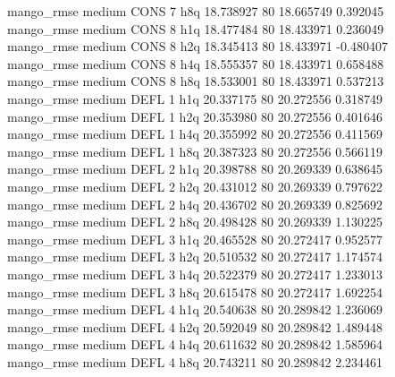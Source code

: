       mango_rmse     medium     CONS                 7                  h8q 18.738927 80      18.665749           0.392045
       mango_rmse     medium     CONS                 8                  h1q 18.477484 80      18.433971           0.236049
       mango_rmse     medium     CONS                 8                  h2q 18.345413 80      18.433971          -0.480407
       mango_rmse     medium     CONS                 8                  h4q 18.555357 80      18.433971           0.658488
       mango_rmse     medium     CONS                 8                  h8q 18.533001 80      18.433971           0.537213
       mango_rmse     medium     DEFL                 1                  h1q 20.337175 80      20.272556           0.318749
       mango_rmse     medium     DEFL                 1                  h2q 20.353980 80      20.272556           0.401646
       mango_rmse     medium     DEFL                 1                  h4q 20.355992 80      20.272556           0.411569
       mango_rmse     medium     DEFL                 1                  h8q 20.387323 80      20.272556           0.566119
       mango_rmse     medium     DEFL                 2                  h1q 20.398788 80      20.269339           0.638645
       mango_rmse     medium     DEFL                 2                  h2q 20.431012 80      20.269339           0.797622
       mango_rmse     medium     DEFL                 2                  h4q 20.436702 80      20.269339           0.825692
       mango_rmse     medium     DEFL                 2                  h8q 20.498428 80      20.269339           1.130225
       mango_rmse     medium     DEFL                 3                  h1q 20.465528 80      20.272417           0.952577
       mango_rmse     medium     DEFL                 3                  h2q 20.510532 80      20.272417           1.174574
       mango_rmse     medium     DEFL                 3                  h4q 20.522379 80      20.272417           1.233013
       mango_rmse     medium     DEFL                 3                  h8q 20.615478 80      20.272417           1.692254
       mango_rmse     medium     DEFL                 4                  h1q 20.540638 80      20.289842           1.236069
       mango_rmse     medium     DEFL                 4                  h2q 20.592049 80      20.289842           1.489448
       mango_rmse     medium     DEFL                 4                  h4q 20.611632 80      20.289842           1.585964
       mango_rmse     medium     DEFL                 4                  h8q 20.743211 80      20.289842           2.234461
